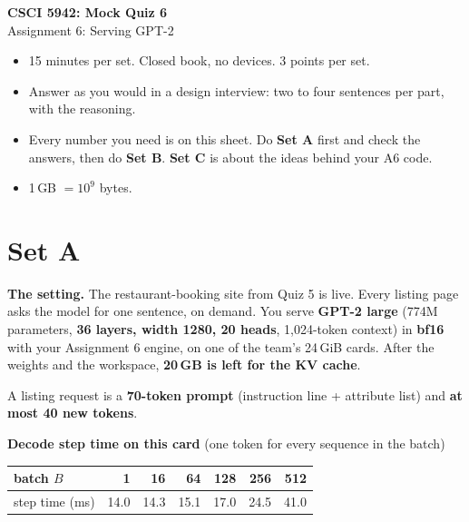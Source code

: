 \documentclass[10pt]{article}
\begin{document}
\begin{center}
{\Large\bfseries CSCI 5942: Mock Quiz 6}\\[3pt]
{\large Assignment 6: Serving GPT-2}
\end{center}

\begin{tcolorbox}[colback=black!4, colframe=black!40, boxrule=0.4pt, arc=0pt]
\begin{itemize}[leftmargin=*, nosep]
\item 15 minutes per set. Closed book, no devices. 3 points per set.
\item Answer as you would in a design interview: two to four sentences per
  part, with the reasoning.
\item Every number you need is on this sheet. Do \textbf{Set A} first and
  check the answers, then do \textbf{Set B}. \textbf{Set C} is about
  the ideas behind your A6 code.
\item 1\,GB $= 10^9$ bytes.
\end{itemize}
\end{tcolorbox}

\section*{Set A}

\textbf{The setting.} The restaurant-booking site from Quiz 5 is live.
Every listing page asks the model for one sentence, on demand. You serve
\textbf{GPT-2 large} (774M parameters, \textbf{36 layers, width 1280, 20
heads}, 1{,}024-token context) in \textbf{bf16} with your Assignment 6
engine, on one of the team's 24\,GiB cards. After the weights and the
workspace, \textbf{20\,GB is left for the KV cache}.

A listing request is a \textbf{70-token prompt} (instruction line +
attribute list) and \textbf{at most 40 new tokens}.

\begin{center}
\textbf{Decode step time on this card} (one token for every sequence in the batch)\\[4pt]
\begin{tabular}{lrrrrrr}
\toprule
batch $B$ & 1 & 16 & 64 & 128 & 256 & 512 \\
\midrule
step time (ms) & 14.0 & 14.3 & 15.1 & 17.0 & 24.5 & 41.0 \\
\bottomrule
\end{tabular}
\end{center}
\end{document}

